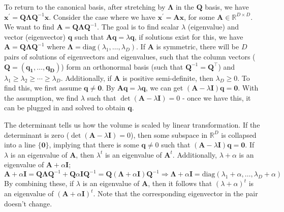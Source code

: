 \documentclass[a4paper, 12pt]{article}
\newcommand{\mat}[1]{\boldsymbol{#1}}
\renewcommand{\vec}[1]{\boldsymbol{#1}}
\newcommand{\mbbr}[0]{\mathbb{R}}
\begin{document}
            To return to the canonical basis, after stretching by $\mat{\Lambda}$ in the $\mat{Q}$ basis, we have $\vec{x^\prime} = \mat{Q} \mat{\Lambda} \mat{Q}^{-1} \vec{x}$.
            Consider the case where we have $\vec{x^\prime} = \mat{A}\vec{x}$, for some $\mat{A} \in \mbbr^{D \times D}$.
            We want to find $\mat{A} = \mat{Q} \mat{\Lambda} \mat{Q}^{-1}$.
            The goal is to find scalar $\lambda$ (eigenvalue) and vector (eigenvector) $\vec{q}$ such that $\mat{A}\vec{q} = \lambda\vec{q}$, if solutions exist for this, we have $\mat{A} = \mat{Q} \mat{\Lambda} \mat{Q}^{-1}$ where $\mat{\Lambda} = \mathrm{diag}(\lambda_1, \dots, \lambda_D)$.
            If $\mat{A}$ is symmetric, there will be $D$ pairs of solutions of eigenvectors and eigenvalues, such that the column vectors ($\mat{Q} = (\vec{q_1}, \dots, \vec{q_D})$) form an orthonormal basis (such that $\mat{Q}^{-1} = \mat{Q}^\top$) and $\lambda_1 \geq \lambda_2 \geq \cdots \geq \lambda_D$.
            Additionally, if $\mat{A}$ is positive semi-definite, then $\lambda_D \geq 0$.
            To find this, we first assume $\vec{q} \neq \vec{0}$.
            By $\mat{A}\vec{q} = \lambda\vec{q}$, we can get $(\mat{A} - \lambda\mat{I})\vec{q} = \vec{0}$.
            With the assumption, we find $\lambda$ such that $\det(\mat{A} - \lambda\mat{I}) = 0$ - once we have this, it can be plugged in and solved to obtain $\vec{q}$.
            \medskip

            The determinant tells us how the volume is scaled by linear transformation.
            If the determinant is zero ($\det(\mat{A} - \lambda\mat{I}) = 0$), then some subspace in $\mbbr^D$ is collapsed into a line $\{ \vec{0} \}$, implying that there is some $\vec{q} \neq 0$ such that $(\mat{A} - \lambda\mat{I}) \vec{q} = \vec{0}$.
            If $\lambda$ is an eigenvalue of $\mat{A}$, then $\lambda^t$ is an eigenvalue of $\mat{A}^t$.
            Additionally, $\lambda + \alpha$ is an eigenvalue of $\mat{A} + \alpha\mat{I}$;
            $$\mat{A} + \alpha\mat{I} = \mat{Q}\mat{\Lambda}\mat{Q}^{-1} + \mat{Q}\alpha\mat{I}\mat{Q}^{-1} = \mat{Q}(\mat{\Lambda} + \alpha\mat{I})\mat{Q}^{-1} \Rightarrow \mat{\Lambda} + \alpha\mat{I} = \mathrm{diag}(\lambda_1 + \alpha, \dots, \lambda_D + \alpha)$$
            By combining these, if $\lambda$ is an eigenvalue of $\mat{A}$, then it follows that $(\lambda + \alpha)^t$ is an eigenvalue of $(\mat{A} + \alpha\mat{I})^t$.
            Note that the corresponding eigenvector in the pair doesn't change.
            \medskip
\end{document}
